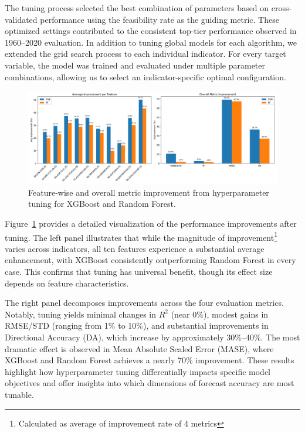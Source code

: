 \documentclass[12pt]{article}
\begin{document}
The tuning process selected the best combination of parameters based on cross-validated performance using the feasibility rate as the guiding metric. These optimized settings contributed to the consistent top-tier performance observed in 1960–2020 evaluation.
In addition to tuning global models for each algorithm, we extended the grid search process to each individual indicator. For every target variable, the model was trained and evaluated under multiple parameter combinations, allowing us to select an indicator-specific optimal configuration. 
\begin{figure}[H]
    \centering
    \includegraphics[width=\textwidth]{featurewise_and_modelwise_improvement.png}
    \caption{Feature-wise and overall metric improvement from hyperparameter tuning for XGBoost and Random Forest.}
    \label{fig:tuning_combined}
\end{figure}

Figure~\ref{fig:tuning_combined} provides a detailed visualization of the performance improvements after tuning. The left panel illustrates that while the magnitude of improvement\footnote{Calculated as average of improvement rate of 4 metrics} varies across indicators, all ten features experience a substantial average enhancement, with XGBoost consistently outperforming Random Forest in every case. This confirms that tuning has universal benefit, though its effect size depends on feature characteristics.

The right panel decomposes improvements across the four evaluation metrics. Notably, tuning yields minimal changes in $R^2$ (near 0\%), modest gains in RMSE/STD (ranging from 1\% to 10\%), and substantial improvements in Directional Accuracy (DA), which increase by approximately 30\%--40\%. The most dramatic effect is observed in Mean Absolute Scaled Error (MASE), where XGBoost and Random Forest achieves a nearly 70\% improvement. 
These results highlight how hyperparameter tuning differentially impacts specific model objectives and offer insights into which dimensions of forecast accuracy are most tunable.
\end{document}
